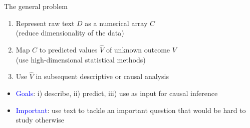 \documentclass[english]{beamer}
\begin{document}
\begin{frame}{The general problem}
\begin{enumerate}
\setlength{\itemsep}{1em}
\item Represent raw text ${D}$ as a numerical array $C$ \\
\vspace{2pt}
 (reduce dimensionality of the data)
 
\item Map $C$ to predicted values $\hat{V}$ of unknown outcome $V$\\
\vspace{2pt}
 (use high-dimensional statistical methods)
 
\item Use $\hat{V}$ in subsequent descriptive or causal analysis\\

\end{enumerate}

\vspace{5pt}

\begin{itemize}
\item \textcolor{blue}{Goals}: i) describe, ii) predict, iii) use as input for causal inference
\end{itemize}

\vspace{5pt}

\begin{itemize}
\item \textcolor{blue}{Important}: use text to tackle an important question that would be hard to study otherwise
\end{itemize}

\end{frame}
\end{document}
